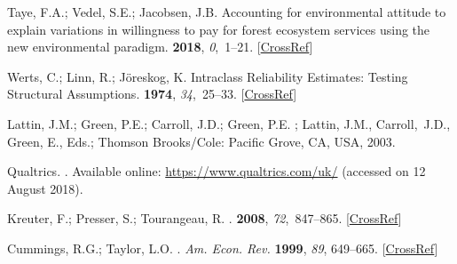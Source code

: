 \documentclass[sustainability,article,accept,moreauthors,pdftex,10pt,a4paper]{Definitions/mdpi}
\theoremstyle{mdpi}
\newcounter{ex}
\newcounter{re}
\theoremstyle{mdpidefinition}
\begin{document}
{\begin{thebibliography}{999}
Taye, F.A.; Vedel, S.E.; Jacobsen, J.B.
\newblock Accounting for environmental attitude to explain variations in
willingness to pay for forest ecosystem services using the new environmental
paradigm.
 {\bf 2018}, {\em
0},~1--21. [\href{http://dx.doi.org/10.1080/21606544.2018.1467346}{CrossRef}]

Werts, C.; Linn, R.; Jöreskog, K.
\newblock Intraclass Reliability Estimates: Testing Structural Assumptions.
 {\bf 1974}, {\em
34},~25--33. [\href{http://dx.doi.org/10.1177/001316447403400104}{CrossRef}]

Lattin, J.M.; Green, P.E.; Carroll, J.D.; Green, P.E.
; { Lattin, J.M.,  Carroll,~J.D., Green, E.,  Eds.};  Thomson Brooks/Cole: Pacific Grove, CA, USA,
2003.


Qualtrics.
. Available online:
\newblock \url{https://www.qualtrics.com/uk/} (accessed on 12 August 2018).    %

Kreuter, F.; Presser, S.; Tourangeau, R.
.
 {\bf 2008}, {\em 72},~847--865. [\href{http://dx.doi.org/10.1093/poq/nfn063}{CrossRef}]

Cummings, R.G.; Taylor, L.O.
.  \emph{Am. Econ. Rev.} \textbf{1999}, \emph{89}, 649--665. [\href{http://dx.doi.org/10.1257/aer.89.3.649}{CrossRef}]


\end{thebibliography}}
\end{document}
